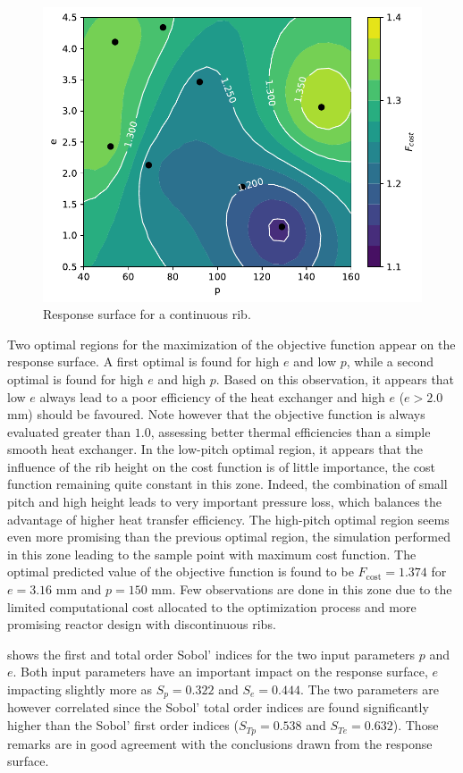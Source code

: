 \begin{figure}[h]
\centering
\includegraphics[width=0.7\linewidth,keepaspectratio]{fig/applications/optim/GP_continuous.pdf}
\caption{Response surface for a continuous rib.}
\label{continuous_RS}
\end{figure}

Two optimal regions for the maximization of the objective function appear on the response surface. A first optimal is found for high $e$ and low $p$, while a second optimal is found for high $e$ and high $p$. Based on this observation, it appears that low $e$ always lead to a poor efficiency of the heat exchanger and high $e$ ($e > 2.0$ mm) should be favoured. Note however that the objective function is always evaluated greater than $1.0$, assessing better thermal efficiencies than a simple smooth heat exchanger. In the low-pitch optimal region, it appears that the influence of the rib height on the cost function is of little importance, the cost function remaining quite constant in this zone. Indeed, the combination of small pitch and high height leads to very important pressure loss, which balances the advantage of higher heat transfer efficiency. The high-pitch optimal region seems even more promising than the previous optimal region, the simulation performed in this zone leading to the sample point with maximum cost function. The optimal predicted value of the objective function is found to be $F_{\text{cost}} = 1.374$ for $e = 3.16$ mm and $p = 150$ mm. Few observations are done in this zone due to the limited computational cost allocated to the optimization process and more promising reactor design with discontinuous ribs.

 shows the first and total order Sobol' indices for the two input parameters $p$ and $e$. Both input parameters have an important impact on the response surface, $e$ impacting slightly more as $S_p = 0.322$ and $S_e = 0.444$. The two parameters are however correlated since the Sobol' total order indices are found significantly higher than the Sobol' first order indices ($S_{Tp} = 0.538$ and $S_{Te} = 0.632$). Those remarks are in good agreement with the conclusions drawn from the response surface. 

